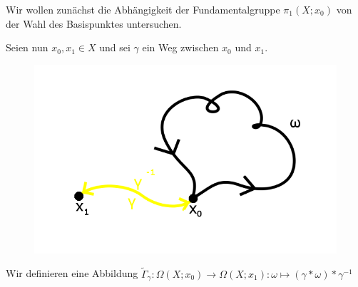 \documentclass[a4paper,10pt]{scrartcl}
\begin{document}
Wir wollen zunächst die Abhängigkeit der Fundamentalgruppe $\pi_1(X;x_0)$ von der Wahl des Basispunktes untersuchen.\\
\begin{figure}[ht]
\centering
{} 
\caption{}
\end{figure}

Seien nun $x_0,x_1 \in X$ und sei $\gamma$ ein Weg zwischen $x_0$ und $x_1$.
\begin{figure}[ht]
\centering
\includegraphics[scale=0.3]{fig66.png}
\caption{}
\end{figure}
Wir definieren eine Abbildung $\tilde \Gamma_\gamma: \Omega(X;x_0)\to \Omega(X;x_1): \omega\mapsto (\gamma*\omega)*\gamma^{-1}$
\end{document}
